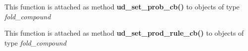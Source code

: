 \begin{DoxyRefList}
\item[\label{wrappers__wrappers000038}%
\Hypertarget{wrappers__wrappers000038}%
Global \mbox{\hyperlink{unstructured__domains_8h_a13ac877c9db89a1a5b5d9c0394148595}{vrna\+\_\+ud\+\_\+set\+\_\+prob\+\_\+cb}} (vrna\+\_\+fold\+\_\+compound\+\_\+t $\ast$vc, vrna\+\_\+callback\+\_\+ud\+\_\+probs\+\_\+add $\ast$setter, vrna\+\_\+callback\+\_\+ud\+\_\+probs\+\_\+get $\ast$getter)]This function is attached as method {\bfseries ud\+\_\+set\+\_\+prob\+\_\+cb()} to objects of type {\itshape fold\+\_\+compound}  
\item[\label{wrappers__wrappers000036}%
\Hypertarget{wrappers__wrappers000036}%
Global \mbox{\hyperlink{group__domains__up_ga745a99f0bc72898d54de16f6e538828a}{vrna\+\_\+ud\+\_\+set\+\_\+prod\+\_\+rule\+\_\+cb}} (vrna\+\_\+fold\+\_\+compound\+\_\+t $\ast$vc, vrna\+\_\+callback\+\_\+ud\+\_\+production $\ast$pre\+\_\+cb, vrna\+\_\+callback\+\_\+ud\+\_\+energy $\ast$e\+\_\+cb)]This function is attached as method {\bfseries ud\+\_\+set\+\_\+prod\+\_\+rule\+\_\+cb()} to objects of type {\itshape fold\+\_\+compound} 
\end{DoxyRefList}